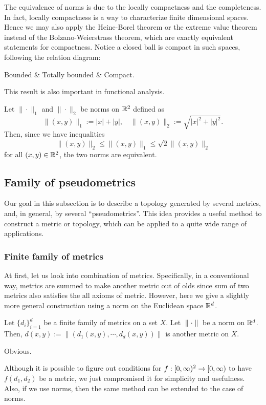 \documentclass{../crs}
\begin{document}
\begin{rmk}
The equivalence of norms is due to the locally compactness and the completeness.
In fact, locally compactness is a way to characterize finite dimensional spaces.
Hence we may also apply the Heine-Borel theorem or the extreme value theorem instead of the Bolzano-Weierstrass theorem, which are exactly equivalent statements for compactness.
Notice a closed ball is compact in such spaces, following the relation diagram:
\begin{rd}[column sep=huge]
Bounded  & Totally bounded  & Compact.
\end{rd}
This result is also important in functional analysis.
\end{rmk}

\begin{ex}
Let $\|\cdot\|_1$ and $\|\cdot\|_2$ be norms on $\mathbb{R}^2$ defined as
\[\|(x,y)\|_1:=|x|+|y|,\quad\|(x,y)\|_2:=\sqrt{|x|^2+|y|^2}.\]
Then, since we have inequalities
\[\|(x,y)\|_2\le\|(x,y)\|_1\le\sqrt2\|(x,y)\|_2\]
for all $(x,y)\in\mathbb{R}^2$, the two norms are equivalent.
\end{ex}



\subsection{Family of pseudometrics}

Our goal in this subsection is to describe a topology generated by several metrics, and, in general, by several ``pseudometrics''.
This idea provides a useful method to construct a metric or topology, which can be applied to a quite wide range of applications.

\subsubsection{Finite family of metrics}
At first, let us look into combination of metrics.
Specifically, in a conventional way, metrics are summed to make another metric out of olds since sum of two metrics also satisfies the all axioms of metric.
However, here we give a slightly more general construction using a norm on the Euclidean space $\mathbb{R}^d$.

\begin{prop}
Let $\{d_i\}_{i=1}^d$ be a finite family of metrics on a set $X$.
Let $\|\cdot\|$ be a norm on $\mathbb{R}^d$.
Then, $d(x,y):=\|(d_1(x,y),\cdots,d_d(x,y))\|$ is another metric on $X$.
\end{prop}
\begin{pf}
Obvious.
\end{pf}
\begin{rmk}
Although it is possible to figure out conditions for $f:[0,\oo)^2\to[0,\oo)$ to have $f(d_1,d_2)$ be a metric, we just compromised it for simplicity and usefulness.
Also, if we use norms, then the same method can be extended to the case of norms.
\end{rmk}
\end{document}
